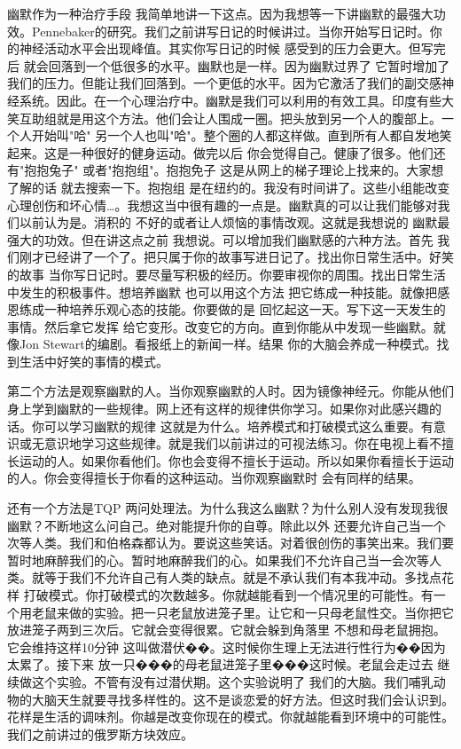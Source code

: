 幽默作为一种治疗手段 我简单地讲一下这点。因为我想等一下讲幽默的最强大功效。Pennebaker的研究。我们之前讲写日记的时候讲过。当你开始写日记时。你的神经活动水平会出现峰值。其实你写日记的时候 感受到的压力会更大。但写完后 就会回落到一个低很多的水平。幽默也是一样。因为幽默过界了 它暂时增加了我们的压力。但能让我们回落到。一个更低的水平。因为它激活了我们的副交感神经系统。因此。在一个心理治疗中。幽默是我们可以利用的有效工具。印度有些大笑互助组就是用这个方法。他们会让人围成一圈。把头放到另一个人的腹部上。一个人开始叫"哈" 另一个人也叫"哈"。整个圈的人都这样做。直到所有人都自发地笑起来。这是一种很好的健身运动。做完以后 你会觉得自己。健康了很多。他们还有"抱抱兔子" 或者"抱抱组"。抱抱免子 这是从网上的梯子理论上找来的。大家想了解的话 就去搜索一下。抱抱组 是在纽约的。我没有时间讲了。这些小组能改变心理创伤和坏心情…。我想这当中很有趣的一点是。幽默真的可以让我们能够对我们以前认为是。消积的 不好的或者让人烦恼的事情改观。这就是我想说的 幽默最强大的功效。但在讲这点之前 我想说。可以增加我们幽默感的六种方法。首先 我们刚才已经讲了一个了。把只属于你的故事写进日记了。找出你日常生活中。好笑的故事 当你写日记时。要尽量写积极的经历。你要审视你的周围。找出日常生活中发生的积极事件。想培养幽默 也可以用这个方法 把它练成一种技能。就像把感恩练成一种培养乐观心态的技能。你要做的是 回忆起这一天。写下这一天发生的事情。然后拿它发挥 给它变形。改变它的方向。直到你能从中发现一些幽默。就像Jon Stewart的编剧。看报纸上的新闻一样。结果 你的大脑会养成一种模式。找到生活中好笑的事情的模式。 

第二个方法是观察幽默的人。当你观察幽默的人时。因为镜像神经元。你能从他们身上学到幽默的一些规律。网上还有这样的规律供你学习。如果你对此感兴趣的话。你可以学习幽默的规律 这就是为什么。培养模式和打破模式这么重要。有意识或无意识地学习这些规律。就是我们以前讲过的可视法练习。你在电视上看不擅长运动的人。如果你看他们。你也会变得不擅长于运动。所以如果你看擅长于运动的人。你会变得擅长于你看的这种运动。当你观察幽默时 会有同样的结果。 

还有一个方法是TQP 两问处理法。为什么我这么幽默？为什么别人没有发现我很幽默？不断地这么问自己。绝对能提升你的自尊。除此以外 还要允许自己当一个次等人类。我们和伯格森都认为。要说这些笑话。对着很创伤的事笑出来。我们要暂时地麻醉我们的心。暂时地麻醉我们的心。如果我们不允许自己当一会次等人类。就等于我们不允许自己有人类的缺点。就是不承认我们有本我冲动。多找点花样 打破模式。你打破模式的次数越多。你就越能看到一个情况里的可能性。有一个用老鼠来做的实验。把一只老鼠放进笼子里。让它和一只母老鼠性交。当你把它放进笼子两到三次后。它就会变得很累。它就会躲到角落里 不想和母老鼠拥抱。它会维持这样10分钟 这叫做潜伏��。这时候你生理上无法进行性行为��因为太累了。接下来 放一只���的母老鼠进笼子里���这时候。老鼠会走过去 继续做这个实验。不管有没有过潜伏期。这个实验说明了 我们的大脑。我们哺乳动物的大脑天生就要寻找多样性的。这不是谈恋爱的好方法。但这时我们会认识到。花样是生活的调味剂。你越是改变你现在的模式。你就越能看到环境中的可能性。我们之前讲过的俄罗斯方块效应。 

